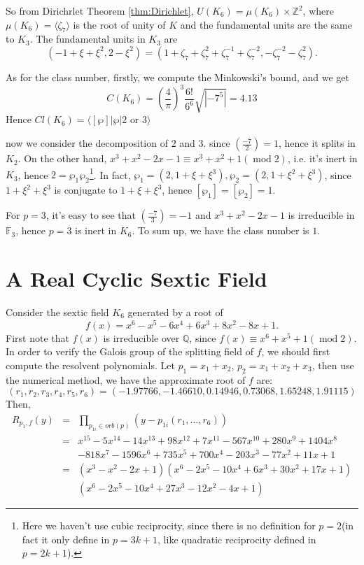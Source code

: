 So from Dirichrlet Theorem \ref{thm:Dirichlet}, $U(K_6)=\mu(K_6)\times \mathbb{Z}^2$, where $\mu(K_6)=\langle\zeta_7\rangle$ is the root of unity of $K$ and the fundamental units are the same to $K_3$. The fundamental units in $K_3$ are $$(-1+\xi+\xi^2,2-\xi^2)=(1+\zeta_7+\zeta_7^2+\zeta_7^{-1}+\zeta_7^{-2},-\zeta_7^{-2}-\zeta_7^{2}).$$

As for the class number, firstly, we compute the Minkowski's bound, and we get $$C(K_6)=\left(\frac{4}{\pi}\right)^3\frac{6!}{6^6}\sqrt{|-7^5|}=4.13$$
Hence $Cl(K_6)=\langle[\wp]|\wp|2\text{ or }3\rangle$

now we consider the decomposition of $2$ and $3$. since $\left(\frac{-7}{2}\right)=1$, hence it splits in $K_2$. On the other hand, $x^3+x^2-2x-1\equiv x^3+x^2+1 (\operatorname{mod} 2)$, i.e. it's inert in $K_3$, hence $2=\wp_1\wp_2$\footnote{Here we haven't use cubic reciprocity, since there is no definition for $p=2$(in fact it only define in $p=3k+1$, like quadratic reciprocity defined in $p=2k+1$).}. In fact, $\wp_1=(2,1+\xi+\xi^3),\wp_2=(2,1+\xi^2+\xi^3)$, since $1+\xi^2+\xi^3$ is conjugate to $1+\xi+\xi^3$, hence $[\wp_1]=[\wp_2]=1$.

For $p=3$, it's easy to see that $\left(\frac{-7}{3}\right)=-1$ and $x^3+x^2-2x-1$ is irreducible in $\mathbb{F}_3$, hence $p=3$ is inert in $K_6$. To sum up, we have the class number is $1$.


\section{A Real Cyclic Sextic Field}\label{sec:rcsfexam}
Consider the sextic field $K_6$ generated by a root of $$f(x)=x^6-x^5-6x^4+6x^3+8x^2-8x+1.$$ First note that $f(x)$ is irreducible over $\mathbb{Q}$, since $f(x)\equiv x^6+x^5+1 (\operatorname{mod} 2)$. In order to verify the Galois group of the splitting field of $f$, we should first compute the resolvent polynomials. Let $p_1=x_1+x_2$, $p_2=x_1+x_2+x_3$, then use the numerical method, we have the approximate root of $f$ are: $$(r_1,r_2,r_3,r_4,r_5,r_6)=(-1.97766,-1.46610,0.14946,0.73068,1.65248,1.91115)$$
Then, \begin{eqnarray*}
R_{p_1,f}(y)&=&\prod_{p_{1i}\in orb(p)}(y-p_{1i}(r_1,\dots,r_6))\\
&=& x^{15}-5x^{14}-14x^{13}+98x^{12}+7x^{11}-567x^{10}+280x^9+1404x^8\\
&&-818x^7-1596x^6+735x^5+700x^4-203x^3-77x^2+11x+1\\
&=&(x^3-x^2-2 x+1)(x^6-2 x^5-10 x^4+6 x^3+30 x^2+17 x+1)\\
&&(x^6-2 x^5-10 x^4+27 x^3-12 x^2-4 x+1)
\end{eqnarray*} 

